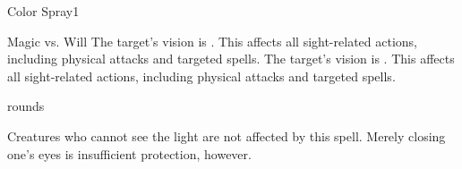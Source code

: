 \begin{spellsection}{Color Spray}{1}
\begin{spellheader}
\end{spellheader}
\begin{spellcontent}
    \begin{spelltargetinginfo}
    \end{spelltargetinginfo}
    \begin{spelleffects}
        \begin{spellattack}{Magic vs. Will}
            \spellsuccess The target's vision is \impaired. This affects all sight-related actions, including physical attacks and targeted spells.
            \spellcritical The target's vision is \severelyimpaired. This affects all sight-related actions, including physical attacks and targeted spells.
        \end{spellattack}
         rounds
    \end{spelleffects}
\end{spellcontent}
\begin{spellfooter}
    \spellnotes Creatures who cannot see the light are not affected by this spell. Merely closing one's eyes is insufficient protection, however.
\end{spellfooter}
\end{spellsection}

